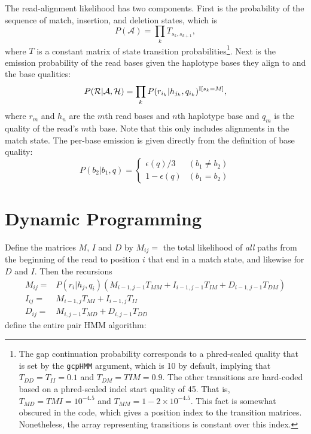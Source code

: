 \documentclass[nofootinbib,amssymb,amsmath]{revtex4}
\newcommand{\code}[1]{\texttt{#1}}
\newcommand{\mc}[1]{\mathcal{#1}}
\begin{document}
The read-alignment likelihood has two components.  First is the probability of the sequence of match, insertion, and deletion states, which is
\begin{equation}
P(\mc{A}) = \prod_k T_{s_k, s_{k+1}},
\end{equation}
where $T$ is a constant matrix of state transition probabilities\footnote{The gap continuation probability corresponds to a phred-scaled quality that is set by the \code{gcpHMM} argument, which is 10 by default, implying that $T_{DD} = T_{II} = 0.1$ and $T_{DM} = T{IM} = 0.9$.  The other transitions are hard-coded based on a phred-scaled indel start quality of 45.  That is, $T_{MD} = T{MI} = 10^{-4.5}$ and $T_{MM} = 1 - 2 \times 10^{-4.5}$.  This fact is somewhat obscured in the code, which gives a position index to the transition matrices.  Nonetheless, the array representing transitions is constant over this index.}.  Next is the emission probability of the read bases given the haplotype bases they align to and the base qualities:
\begin{equation}
P(\mc{R} | \mc{A}, \mc{H}) = \prod_k P(r_{i_k} | h_{j_k}, q_{i_k})^{{\rm I}[s_k = M]},
\end{equation}
where $r_m$ and $h_n$ are the $m$th read bases and $n$th haplotype base and $q_m$ is the quality of the read's $m$th base.  Note that this only includes alignments in the match state.  The per-base emission is given directly from the definition of base quality:
\begin{equation}
P(b_2 | b_1, q) = \left\{ \begin{array}{cc} \epsilon(q)/3 & (b_1 \ne b_2) \\ 1 - \epsilon(q) & (b_1 = b_2)  \end{array} \right.
\end{equation}

\section{Dynamic Programming}

Define the matrices $M$, $I$ and $D$ by $M_{ij} = $ the total likelihood of \textit{all} paths from the beginning of the read to position $i$ that end in a match state, and likewise for $D$ and $I$.  Then the recursions
\begin{align}
M_{ij} =& P(r_i | h_j, q_i) \left( M_{i-1,j-1} T_{MM} + I_{i-1,j-1} T_{IM} + D_{i-1,j-1} T_{DM} \right) \label{match} \\
I_{ij} =& M_{i-1,j} T_{MI} + I_{i-1,j} T_{II} \label{ins} \\
D_{ij} =& M_{i,j-1} T_{MD} + D_{i, j - 1} T_{DD} \label{del}
\end{align}
define the entire pair HMM algorithm:
\end{document}
